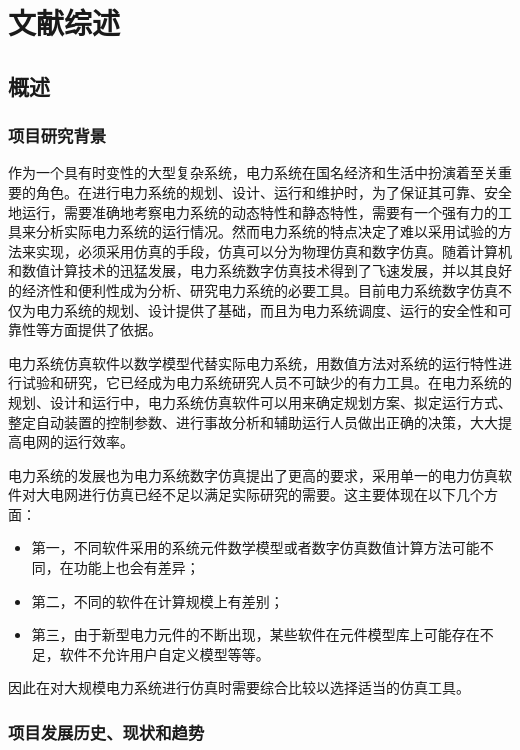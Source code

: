 \chapter{文献综述}

\section{概述}

\subsection{项目研究背景}

作为一个具有时变性的大型复杂系统，电力系统在国名经济和生活中扮演着至关重要的角色。在进行电力系统的规划、设计、运行和维护时，为了保证其可靠、安全地运行，需要准确地考察电力系统的动态特性和静态特性，需要有一个强有力的工具来分析实际电力系统的运行情况。然而电力系统的特点决定了难以采用试验的方法来实现，必须采用仿真的手段，仿真可以分为物理仿真和数字仿真。随着计算机和数值计算技术的迅猛发展，电力系统数字仿真技术得到了飞速发展，并以其良好的经济性和便利性成为分析、研究电力系统的必要工具。目前电力系统数字仿真不仅为电力系统的规划、设计提供了基础，而且为电力系统调度、运行的安全性和可靠性等方面提供了依据。

电力系统仿真软件以数学模型代替实际电力系统，用数值方法对系统的运行特性进行试验和研究，它已经成为电力系统研究人员不可缺少的有力工具。在电力系统的规划、设计和运行中，电力系统仿真软件可以用来确定规划方案、拟定运行方式、整定自动装置的控制参数、进行事故分析和辅助运行人员做出正确的决策，大大提高电网的运行效率。

电力系统的发展也为电力系统数字仿真提出了更高的要求，采用单一的电力仿真软件对大电网进行仿真已经不足以满足实际研究的需要。这主要体现在以下几个方面：
\begin{itemize}
\item 第一，不同软件采用的系统元件数学模型或者数字仿真数值计算方法可能不同，在功能上也会有差异；
\item 第二，不同的软件在计算规模上有差别；
\item 第三，由于新型电力元件的不断出现，某些软件在元件模型库上可能存在不足，软件不允许用户自定义模型等等。
\end{itemize}

因此在对大规模电力系统进行仿真时需要综合比较以选择适当的仿真工具。


\subsection{项目发展历史、现状和趋势}

